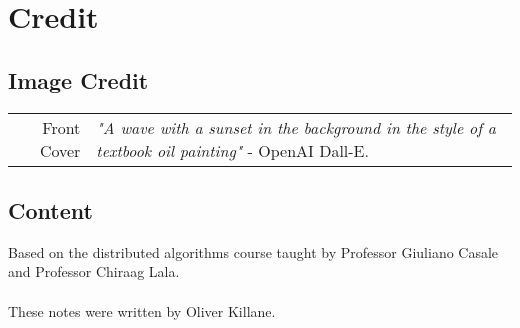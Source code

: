 \chapter{Credit}
\section*{Image Credit}
\begin{center}
	\begin{tabular}{r p{}}
        Front Cover & \textit{"A wave with a sunset in the background in the style of a textbook oil painting"} - OpenAI Dall-E. \\
	\end{tabular}
\end{center}

\section*{Content}
Based on the distributed algorithms course taught by Professor Giuliano Casale and Professor Chiraag Lala.
\\
\\ These notes were written by Oliver Killane.
